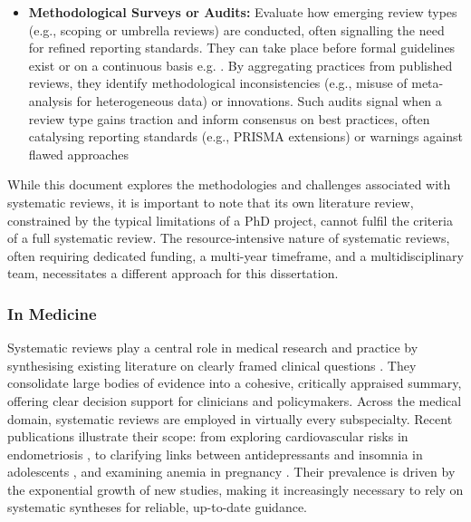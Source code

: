 \documentclass[10pt, english]{article}
\begin{document}
\begin{itemize}
    \item {\bf{Methodological Surveys or Audits:}}  Evaluate how emerging review types (e.g., scoping or umbrella reviews) are conducted, often signalling the need for refined reporting standards. They can take place before formal guidelines exist or on a continuous basis e.g. \cite{dalton_potential_2017, france_methodological_2014}. By aggregating practices from published reviews, they identify methodological inconsistencies (e.g., misuse of meta-analysis for heterogeneous data) or innovations. Such audits signal when a review type gains traction and inform consensus on best practices, often catalysing reporting standards (e.g., PRISMA extensions) or warnings against flawed approaches \cite{tricco_prisma_2018, sarkis-onofre_how_2021,rethlefsen_prisma-s_2021, rethlefsen_prisma-s_2021-1}
\end{itemize}

While this document explores the methodologies and challenges associated with systematic reviews, it is important to note that its own literature review, constrained by the typical limitations of a PhD project, cannot fulfil the criteria of a full systematic review. The resource-intensive nature of systematic reviews, often requiring dedicated funding, a multi-year timeframe, and a multidisciplinary team, necessitates a different approach for this dissertation.

\subsubsection{In Medicine}

Systematic reviews play a central role in medical research and practice by synthesising existing literature on clearly framed clinical questions \cite{kranke_evidence-based_2010, noauthor_cochrane_nodate}. They consolidate large bodies of evidence into a cohesive, critically appraised summary, offering clear decision support for clinicians and policymakers. Across the medical domain, systematic reviews are employed in virtually every subspecialty. Recent publications illustrate their scope: from exploring cardiovascular risks in endometriosis \cite{paras_endometriosis_2025}, to clarifying links between antidepressants and insomnia in adolescents \cite{turkmen_systematic_2025}, and examining anemia in pregnancy \cite{azzam_anaemia_2025}. Their prevalence is driven by the exponential growth of new studies, making it increasingly necessary to rely on systematic syntheses for reliable, up-to-date guidance.
\end{document}
